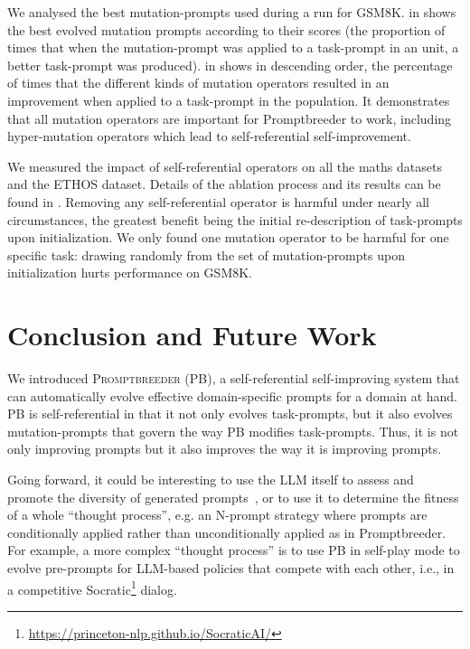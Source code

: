 \documentclass{article} %
\begin{document}
We analysed the best mutation-prompts used during a run for GSM8K.  in  shows the best evolved mutation prompts according to their scores (the proportion of times that when the mutation-prompt was applied to a task-prompt in an unit, a better task-prompt was produced).  in  shows in descending order, the percentage of times that the different kinds of mutation operators resulted in an improvement when applied to a task-prompt in the population. It demonstrates that all mutation operators are important for Promptbreeder to work, including hyper-mutation operators which lead to self-referential self-improvement. 

We measured the impact of self-referential operators on all the maths datasets and the ETHOS dataset. Details of the ablation process and its results can be found in . Removing any self-referential operator is harmful under nearly all circumstances, the greatest benefit being the initial re-description of task-prompts upon initialization. We only found one mutation operator to be harmful for one specific task: drawing randomly from the set of mutation-prompts upon initialization hurts performance on GSM8K.

\section{Conclusion and Future Work}
We introduced \textsc{Promptbreeder} (PB), a self-referential self-improving system that can automatically evolve effective domain-specific prompts for a domain at hand. PB is self-referential in that it not only evolves task-prompts, but it also evolves mutation-prompts that govern the way PB modifies task-prompts. Thus, it is not only improving prompts but it also improves the way it is improving prompts. 

Going forward, it could be interesting to use the LLM itself to assess and promote the diversity of generated prompts~\citep[see][]{DBLP:journals/corr/abs-2306-01711}, or to use it to determine the fitness of a whole ``thought process'', e.g. an N-prompt strategy where prompts are conditionally applied rather than unconditionally applied as in Promptbreeder. For example, a more complex ``thought process'' is to use PB in self-play mode to evolve pre-prompts for LLM-based policies that compete with each other, i.e., in a competitive Socratic\footnote{\url{https://princeton-nlp.github.io/SocraticAI/}} dialog.
\end{document}
